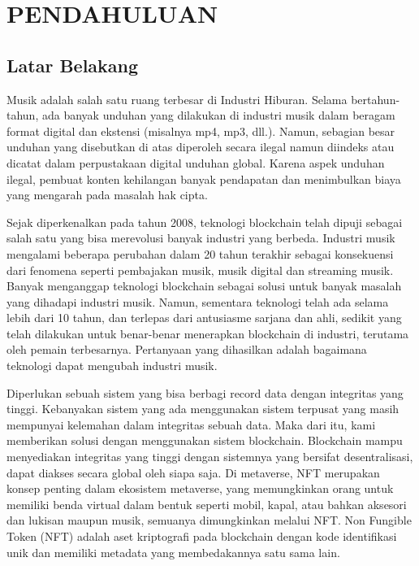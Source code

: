 \section{PENDAHULUAN}

\subsection{Latar Belakang}

Musik adalah salah satu ruang terbesar di Industri Hiburan. Selama bertahun-tahun, ada banyak unduhan yang dilakukan di industri musik dalam beragam format digital
dan ekstensi (misalnya mp4, mp3, dll.). Namun, sebagian besar unduhan yang disebutkan di atas diperoleh secara ilegal namun diindeks
atau dicatat dalam perpustakaan digital unduhan global. Karena aspek unduhan ilegal, pembuat konten kehilangan banyak pendapatan
dan menimbulkan biaya yang mengarah pada masalah hak cipta.

Sejak diperkenalkan pada tahun 2008, teknologi blockchain telah dipuji sebagai salah satu yang bisa
merevolusi banyak industri yang berbeda. Industri musik mengalami beberapa perubahan dalam 20 tahun terakhir sebagai konsekuensi dari fenomena seperti pembajakan musik, musik digital dan streaming musik. Banyak
menganggap teknologi blockchain sebagai solusi untuk banyak masalah yang dihadapi industri musik.
Namun, sementara teknologi telah ada selama lebih dari 10 tahun, dan terlepas dari antusiasme
sarjana dan ahli, sedikit yang telah dilakukan untuk benar-benar menerapkan blockchain di industri,
terutama oleh pemain terbesarnya. Pertanyaan yang dihasilkan adalah bagaimana teknologi dapat mengubah
industri musik.

Diperlukan sebuah sistem yang bisa berbagi record data dengan integritas yang tinggi. Kebanyakan sistem yang ada
menggunakan sistem terpusat yang masih mempunyai kelemahan
dalam integritas sebuah data. Maka dari itu, kami memberikan
solusi dengan menggunakan sistem blockchain. Blockchain mampu
menyediakan integritas yang tinggi dengan sistemnya yang bersifat
desentralisasi, dapat diakses secara global oleh siapa saja. 
Di metaverse, NFT merupakan konsep penting dalam ekosistem metaverse, 
yang memungkinkan orang untuk memiliki benda virtual dalam bentuk seperti mobil, kapal, atau bahkan aksesori dan lukisan maupun musik, semuanya dimungkinkan melalui NFT. 
Non Fungible Token (NFT) adalah aset kriptografi pada blockchain dengan kode identifikasi unik dan memiliki metadata yang membedakannya satu sama lain.

